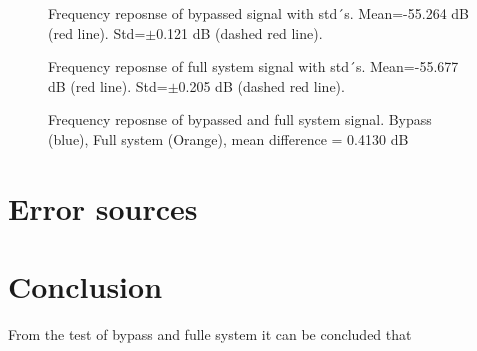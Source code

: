 \begin{figure}[H]
	\centering
	
	\caption{Frequency reposnse of bypassed signal with std´s. Mean=-55.264 dB (red line). Std=$\pm$0.121 dB (dashed red line).}
	\label{fig:FreqRespBypass}
\end{figure}

\begin{figure}[H]
	\centering
	
	\caption{Frequency reposnse of full system signal with std´s. Mean=-55.677 dB (red line). Std=$\pm$0.205 dB (dashed red line).}
	\label{fig:FreqRespSystem}
\end{figure}

\begin{figure}[H]
	\centering
	
	\caption{Frequency reposnse of bypassed and full system signal. Bypass (blue), Full system (Orange), mean difference = 0.4130 dB}
	\label{fig:FreqRespComp}
\end{figure}

\section{Error sources}


\section{Conclusion}
From the test of bypass and fulle system it can be concluded that 